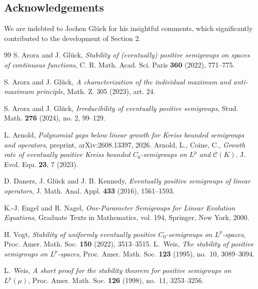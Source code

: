 \documentclass[12pt]{amsart}
\theoremstyle{plain}
\theoremstyle{definition}
\begin{document}
	\subsection*{Acknowledgements}
	We are indebted to Jochen Glück for his insightful comments, which significantly contributed to the development of Section 2.
	\begin{thebibliography}{99}
		S. Arora and J. Gl{\"u}ck,
		\emph{Stability of (eventually) positive semigroups on spaces of continuous functions}, C. R. Math. Acad. Sci. Paris \textbf{360} (2022), 771--775.
		
		S. Arora and J. Gl{\"u}ck,
		\emph{A characterization of the individual maximum and anti-maximum principle},
		Math. Z. 305 (2023), art. 24.
		
		S. Arora and J. Gl\"uck,
		\emph{Irreducibility of eventually positive semigroups},
		Stud. Math. \textbf{276} (2024), no. 2, 99--129.
		
		L. Arnold,
		\textit{Polynomial gaps below linear growth for Kreiss bounded semigroups and operators},
		preprint, arXiv:2608.13397, 2026.
		Arnold, L., Coine, C., \emph{Growth rate of eventually positive Kreiss bounded $C_0$-semigroups on $L^p$ and $\mathcal{C}(K)$}. 
		J. Evol. Equ. \textbf{23}, 7 (2023).
		
		D. Daners, J. Gl\"uck and J. B. Kennedy,
		\emph{Eventually positive semigroups of linear operators},
		J. Math. Anal. Appl. \textbf{433} (2016), 1561--1593.
		
		K.-J. Engel and R. Nagel,
		\emph{One-Parameter Semigroups for Linear Evolution Equations},
		Graduate Texts in Mathematics, vol. 194,
		Springer, New York, 2000.
		
		H. Vogt,
		\emph{Stability of uniformly eventually positive $C_0$-semigroups on $L^p$-spaces},
		Proc. Amer. Math. Soc. \textbf{150} (2022), 3513--3515.
		L.~Weis,
		\emph{The stability of positive semigroups on $L^p$-spaces},
		Proc. Amer. Math. Soc. \textbf{123} (1995), no.~10, 3089--3094.
		
		L.~Weis,
		\emph{A short proof for the stability theorem for positive semigroups on $L^p(\mu)$},
		Proc. Amer. Math. Soc. \textbf{126} (1998), no.~11, 3253--3256.
	\end{thebibliography}
	
\end{document}
